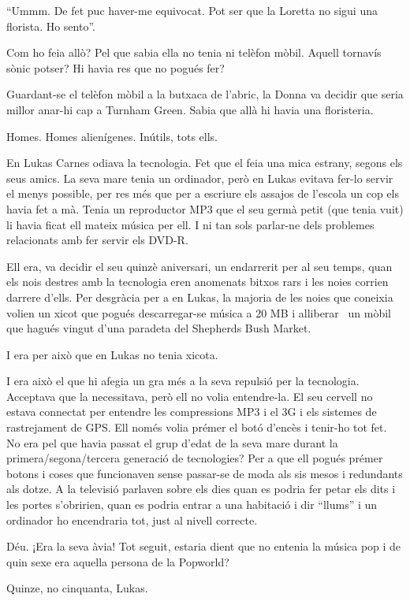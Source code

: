 ``Ummm. De fet puc haver-me equivocat. Pot ser que la Loretta no sigui
una florista. Ho sento''.

Com ho feia allò? Pel que sabia ella no tenia ni telèfon mòbil. Aquell
tornavís sònic potser? Hi havia res que no pogués fer?

Guardant-se el telèfon mòbil a la butxaca de l'abric, la Donna va
decidir que seria millor anar-hi cap a Turnham Green. Sabia que allà hi
havia una floristeria.

Homes. Homes alienígenes. Inútils, tots ells.

En Lukas Carnes odiava la tecnologia. Fet que el feia una mica estrany,
segons els seus amics. La seva mare tenia un ordinador, però en Lukas
evitava fer-lo servir el menys possible, per res més que per a escriure
els assajos de l'escola un cop els havia fet a mà. Tenia un reproductor
MP3 que el seu germà petit (que tenia vuit) li havia ficat ell mateix
música per ell. I ni tan sols parlar-ne dels problemes relacionats amb
fer servir els DVD-R.

Ell era, va decidir el seu quinzè aniversari, un endarrerit per al seu
temps, quan els nois destres amb la tecnologia eren anomenats bitxos
rars i les noies corrien darrere d'ells. Per desgràcia per a en Lukas,
la majoria de les noies que coneixia volien un xicot que pogués
descarregar-se música a 20 MB i alliberar ~un mòbil que hagués vingut
d'una paradeta del Shepherds Bush Market.

I era per això que en Lukas no tenia xicota.

I era això el que hi afegia un gra més a la seva repulsió per la
tecnologia. Acceptava que la necessitava, però ell no volia entendre-la.
El seu cervell no estava connectat per entendre les compressions MP3 i
el 3G i els sistemes de rastrejament de GPS. Ell només volia prémer el
botó d'encès i tenir-ho tot fet. No era pel que havia passat el grup
d'edat de la seva mare durant la primera/segona/tercera generació de
tecnologies? Per a que ell pogués prémer botons i coses que funcionaven
sense passar-se de moda als sis mesos i redundants als dotze. A la
televisió parlaven sobre els dies quan es podria fer petar els dits i
les portes s'obririen, quan es podria entrar a una habitació i dir
``llums'' i un ordinador ho encendraria tot, just al nivell correcte.

Déu. ¡Era la seva àvia! Tot seguit, estaria dient que no entenia la
música pop i de quin sexe era aquella persona de la Popworld?

Quinze, no cinquanta, Lukas.

